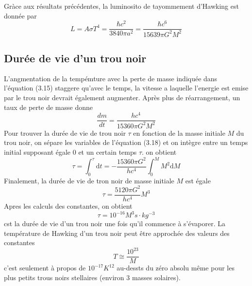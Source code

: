 \documentclass[12pt,  a4paper, openright]{report} %
\begin{document}
Gràce aux résultats précédentes, la luminosito de tayommement d'Hawking est donnée par
$$
L=A \sigma T^{4}=\frac{\hbar c^{2}}{3840 \pi a^{2}}=\frac{\hbar c^{6}}{15639 \pi G^{2} M^{2}}
$$
\subsection { Durée de vie d'un trou noir}
L'angmentation de la tempémture avec la perte de masse indiquée dans l'équation
(3.15) staggere qu'avec le temps, la vitesse a laquelle l'energie est emise par le trou noir devrait également augmenter. Après plus de réarrangement, un taux de perte de masse donne
$$
\frac{d m}{d t}=\frac{h c^{4}}{15360 \pi G^{2} M^{2}}
$$
Pour trouver la durée de vie de trou noir $\tau$ en fonction de la masse initiale $M$ du trou noir, on sépare les variables de l'équation (3.18) et on intègre entre un temps initial supposant égale 0 et un certain temps $\tau$. on obtient
$$
\tau=\int_{0}^{\tau} \mathrm{d} t=-\frac{15360 \pi G^{2}}{h c^{4}} \int_{0}^{M} M^{2} \mathrm{d} M
$$
Finalement, la durée de vie de tron noir de masse initiale $M$ est égale
$$
\tau=\frac{5120 \pi G^{2}}{h c^{4}} M^{3}
$$
Apres les calculs des constantes, on obtient
$$
\tau=10^{-16} M^{3} s \cdot k g^{-3}
$$
cst la durée de vie d'un trou noir une fois qu'il commence à s'évaporer. La température de Hawking d'un trou noir peut être approchée des valeurs des constantes
$$
T \cong \frac{10^{23}}{M}
$$
c'est seulement à propos de $10^{-17} K^{12}$ au-dessts du zéro absolu même pour les plus petits trous noirs stellaires (environ 3 masses solaires).
\end{document}
